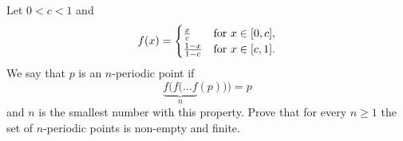 \documentclass{article}
\begin{document}
	\setlength{\parindent}{0pt}
	Let $0<c<1$ and
	$$f(x)=\begin{cases}
		\frac{x}{c}&\textup{for }x\in[0,c],\\
		\frac{1-x}{1-c}&\textup{for }x\in[c,1].
	\end{cases}$$
	We say that $p$ is an $n$-periodic point if
	$$\underbrace{f(f(\dots f}_n (p)))=p$$
	and $n$ is the smallest number with this property. Prove that for every $n\geq 1$ the set of $n$-periodic points is non-empty and finite.
\end{document}

